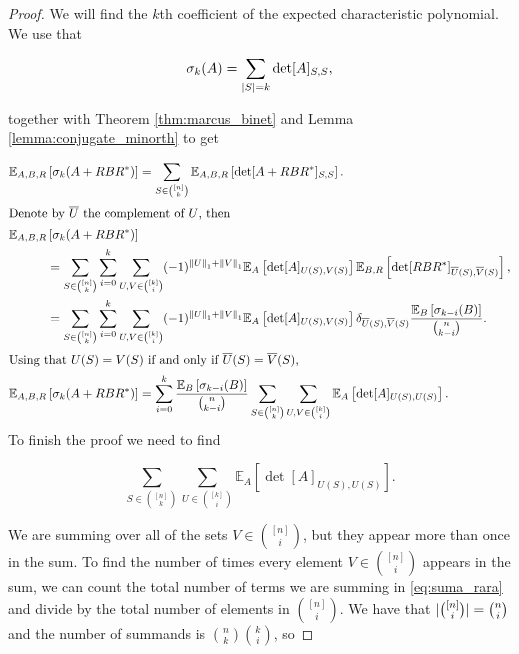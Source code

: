 \begin{proof}
    We will find the $k$th coefficient of the expected characteristic polynomial. We use that

    \begin{equation*}
        \sigma_k(A) = \sum_{\lvert S \rvert=k} \det[A]_{S,S},
    \end{equation*}

    \noindent together with Theorem \ref{thm:marcus_binet} and Lemma \ref{lemma:conjugate_minorth} to get %

    \begin{align*}
        \mathbb E_{A,B,R}&\left[ \sigma_k(A + RBR^*) \right] = \sum_{S \in \binom{[n]}{k}} \mathbb E_{A,B,R} \left[ \det[A + RBR^*]_{S,S} \right].\\ 
        \intertext{Denote by $\overline U$ the complement of $U$, then}
        \mathbb E_{A,B,R}&\left[ \sigma_k(A + RBR^*) \right]\\
        &= \sum_{S\in\binom{[n]}{k}} \sum_{i=0}^k \sum_{U,V\in \binom{[k]}{i}} (-1)^{\left\lVert U\right\rVert_1 + \left\lVert V\right\rVert_1} \mathbb E_A\left[ \det [A]_{U(S),V(S)} \right] \mathbb E_{B,R}\left[ \det[RBR^*]_{\overline{U}(S),\overline{V}(S)} \right],\\ 
        &= \sum_{S\in\binom{[n]}{k}} \sum_{i=0}^k \sum_{U,V\in \binom{[k]}{i}} (-1)^{\left\lVert U\right\rVert_1 + \left\lVert V\right\rVert_1} \mathbb E_A\left[ \det[A]_{U(S),V(S)} \right] \delta_{\overline{U}(S),\overline{V}(S)} \frac{\mathbb E_{B}\left[ \sigma_{k-i}(B)\right]}{\binom{n}{k-i}}.\\ 
        \intertext{Using that $U(S)=V(S)$ if and only if $\overline{U}(S) = \overline{V}(S)$,}
        \mathbb E_{A,B,R}&\left[ \sigma_k(A + RBR^*) \right] = \sum_{i=0}^k \frac{\mathbb E_{B}\left[ \sigma_{k-i}(B)\right]}{\binom{n}{k-i}} \sum_{S\in\binom{[n]}{k}} \sum_{U,V\in \binom{[k]}{i}}  \mathbb E_A\left[\det[A]_{U(S),U(S)} \right].
    \end{align*}
    To finish the proof we need to find

    \begin{equation} \label{eq:suma_rara} \sum_{S\in\binom{[n]}{k}} \sum_{U\in \binom{[k]}{i}}  \mathbb E_A\left[\det[A]_{U(S),U(S)} \right]. \end{equation}

    We are summing over all of the sets $V \in \binom{[n]}{i}$, but they appear more than once in the sum. To find the number of times every element $V\in \binom{[n]}{i}$ appears in the sum, we can count the total number of terms we are summing in \eqref{eq:suma_rara} and divide by the total number of elements in $\binom{[n]}{i}$. We have that $\lvert \binom{[n]}i \rvert = \binom{n}{i}$ and the number of summands is $\binom{n}{k}\binom{k}{i}$, so


\end{proof}

